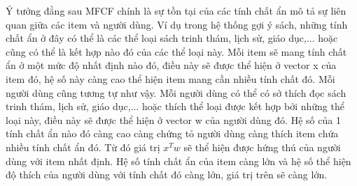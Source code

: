 Ý tưởng đằng sau \gls{MFCF} chính là sự tồn tại của các tính chất ẩn mô tả sự liên quan giữa các item và người dùng. Ví dụ trong hệ thống gợi ý sách, những tính chất ẩn ở đây có thể là các thể loại sách trinh thám, lịch sử, giáo dục,... hoặc cũng có thể là kết hợp nào đó của các thể loại này. Mỗi item sẽ mang tính chất ẩn ở một mức độ nhất định nào đó, điều này sẽ được thể hiện ở vector x của item đó, hệ số này càng cao thể hiện item mang cần nhiều tính chất đó. Mỗi người dùng cũng tương tự như vậy. Mỗi người dùng có thể có sở thích đọc sách trinh thám, lịch sử, giáo dục,... hoặc thích thể loại được kết hợp bởi những thể loại này, điều này sẽ được thể hiện ở vector w của người dùng đó. Hệ số của 1 tính chất ẩn nào đó càng cao càng chứng tỏ người dùng càng thích item chứa nhiều tính chất ẩn đó. Từ đó giá trị $x^T w$ sẽ thể hiện được hứng thú của người dùng với item nhất định. Hệ số tính chất ẩn của item càng lớn và hệ số thể hiện độ thích của người dùng với tính chất đó càng lớn, giá trị trên sẽ càng lớn.